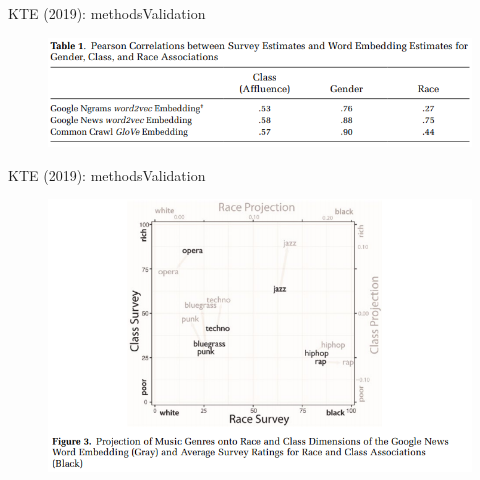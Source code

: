 \documentclass[usenames,dvipsnames,english]{beamer}
\begin{document}
\begin{frame}{KTE (2019): methods}{Validation}
\begin{figure}
    \centering
    \includegraphics[scale = 0.6]{Images/kte_validation2.png}
    \end{figure}
\end{frame}
\begin{frame}{KTE (2019): methods}{Validation}
\begin{figure}
    \centering
    \includegraphics[scale = 0.6]{Images/kte_validation3.png}
    \end{figure}
\end{frame}
\end{document}
